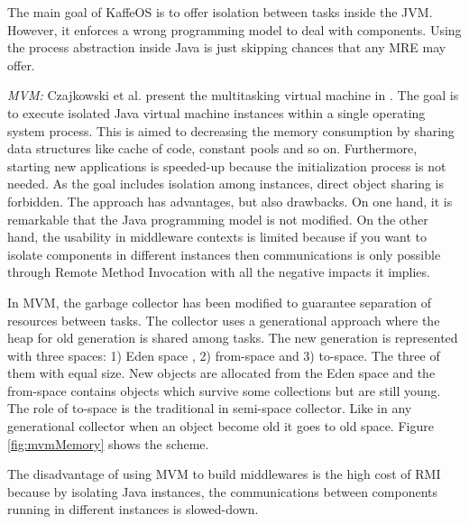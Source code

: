 
The main goal of KaffeOS is to offer isolation between tasks inside the JVM.
However, it enforces a wrong programming model to deal with components.
Using the process abstraction inside Java is just skipping chances that any MRE may offer.

\emph{MVM:} Czajkowski et al. present the multitasking virtual machine in \cite{czajkowski_multitasking_2001}.
The goal is to execute isolated Java virtual machine instances within a single operating system process.
This is aimed to decreasing the memory consumption by sharing data structures like cache of code, constant pools and so on.
Furthermore, starting new applications is speeded-up because the initialization process is not needed.
As the goal includes isolation among instances, direct object sharing is forbidden.
The approach has advantages, but also drawbacks.
On one hand, it is remarkable that the Java programming model is not modified.
On the other hand, the usability in middleware contexts is limited because if you want to isolate components in different instances then communications is only possible through Remote Method Invocation with all the negative impacts it implies.

In MVM, the garbage collector has been modified to guarantee separation of resources between tasks.
The collector uses a generational approach where the heap for old generation is shared among tasks.
The new generation is represented with three spaces: 1) Eden space , 2) from-space and 3) to-space.
The three of them with equal size.
New objects are allocated from the Eden space and the from-space contains objects which survive some collections but are still young.
The role of to-space is the traditional in semi-space collector. Like in any generational collector when an object become old it goes to old space.
Figure \ref{fig:mvmMemory} shows the scheme.

The disadvantage of using MVM to build middlewares is the high cost of RMI because by isolating Java instances, the communications between components running in different instances is slowed-down.



